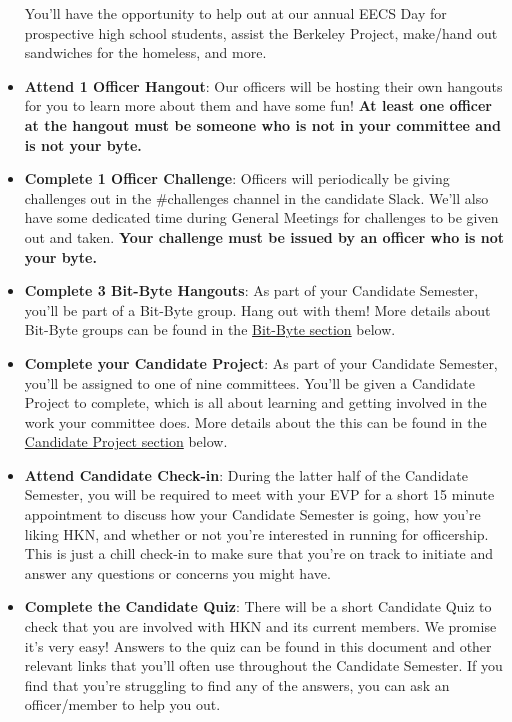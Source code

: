 \documentclass[11pt, article, oneside]{memoir}
\begin{document}
\begin{itemize}
                    You'll have the opportunity to help out at our annual EECS Day for prospective high school students, assist the Berkeley Project, make/hand out sandwiches for the homeless, and more.
                \item
                    \textbf{Attend 1 Officer Hangout}: Our officers will be hosting their own hangouts for you to learn more about them and have some fun!
                    \textbf{At least one officer at the hangout must be someone who is not in your committee and is not your byte.}
                \item
                    \textbf{Complete 1 Officer Challenge}: Officers will periodically be giving challenges out in the \#challenges channel in the candidate Slack.
                    We'll also have some dedicated time during General Meetings for challenges to be given out and taken.
                    \textbf{Your challenge must be issued by an officer who is not your byte.}
                \item
                    \textbf{Complete 3 Bit-Byte Hangouts}: As part of your Candidate Semester, you'll be part of a Bit-Byte group.
                    Hang out with them!
                    More details about Bit-Byte groups can be found in the \hyperref[sec:bit-byte-groups]{Bit-Byte section} below.
                \item
                    \textbf{Complete your Candidate Project}: As part of your Candidate Semester, you'll be assigned to one of nine committees.
                    You'll be given a Candidate Project to complete, which is all about learning and getting involved in the work your committee does.
                    More details about the this can be found in the \hyperref[sec:candidate-project]{Candidate Project section} below.
                \item
                    \textbf{Attend Candidate Check-in}: During the latter half of the Candidate Semester, you will be required to meet with your EVP for a short 15 minute appointment to discuss how your Candidate Semester is going, how you're liking HKN, and whether or not you're interested in running for officership.
                    This is just a chill check-in to make sure that you're on track to initiate and answer any questions or concerns you might have.
                \item
                    \textbf{Complete the Candidate Quiz}: There will be a short Candidate Quiz to check that you are involved with HKN and its current members.
                    We promise it's very easy!
                    Answers to the quiz can be found in this document and other relevant links that you'll often use throughout the Candidate Semester.
                    If you find that you're struggling to find any of the answers, you can ask an officer/member to help you out.
            \end{itemize}
\end{document}
